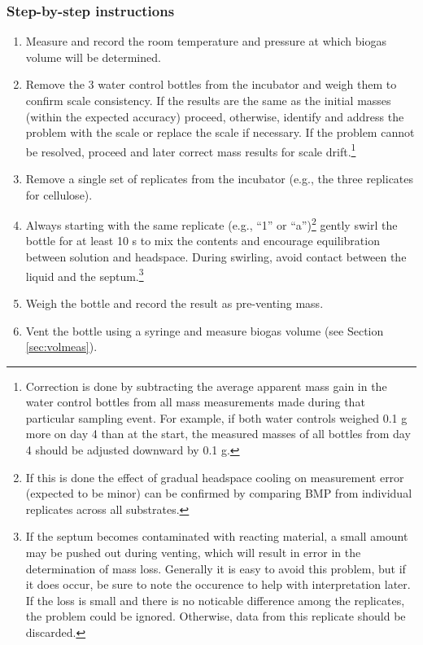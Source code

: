 \documentclass[]{article}
\begin{document}
\subsubsection{Step-by-step instructions} \label{sec:steps}
\begin{enumerate}
    \item Measure and record the room temperature and pressure at which biogas volume will be determined.
    \item Remove the 3 water control bottles from the incubator and weigh them to confirm scale consistency. 
      If the results are the same as the initial masses (within the expected accuracy) proceed, otherwise, identify and address the problem with the scale or replace the scale if necessary.
      If the problem cannot be resolved, proceed and later correct mass results for scale drift.\footnote{
        Correction is done by subtracting the average apparent mass gain in the water control bottles from all mass measurements made during that particular sampling event. 
        For example, if both water controls weighed 0.1 g more on day 4 than at the start, the measured masses of all bottles from day 4 should be adjusted downward by 0.1 g.
      }
    \item Remove a single set of replicates from the incubator (e.g., the three replicates for cellulose).
    \item Always starting with the same replicate (e.g., ``1'' or ``a'')\footnote{
        If this is done the effect of gradual headspace cooling on measurement error (expected to be minor) can be confirmed by comparing BMP from individual replicates across all substrates.
      } gently swirl the bottle for at least 10 s to mix the contents and encourage  equilibration between solution and headspace. 
      During swirling, avoid contact between the liquid and the septum.\footnote{
        If the septum becomes contaminated with reacting material, a small amount may be pushed out during venting, which will result in error in the determination of mass loss.
        Generally it is easy to avoid this problem, but if it does occur, be sure to note the occurence to help with interpretation later.
        If the loss is small and there is no noticable difference among the replicates, the problem could be ignored. 
        Otherwise, data from this replicate should be discarded.
      }
    \item Weigh the bottle and record the result as pre-venting mass.
    \item Vent the bottle using a syringe and measure biogas volume (see Section \ref{sec:volmeas}).

\end{enumerate}
\end{document}
